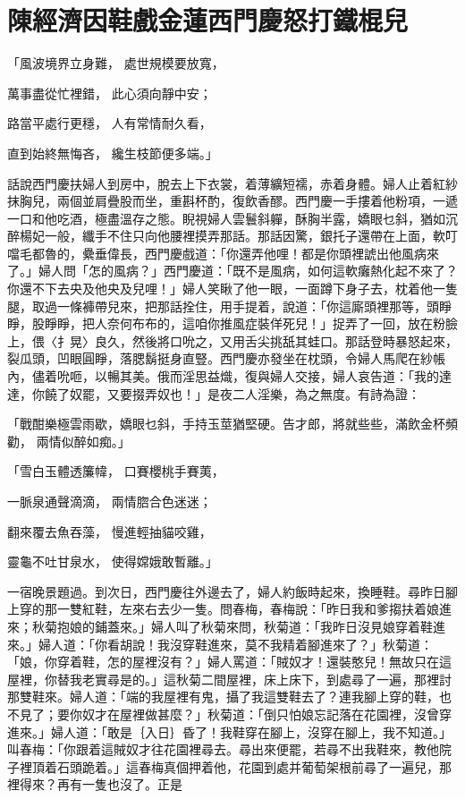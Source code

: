 %

\chapter{陳經濟因鞋戲金蓮\KG 西門慶怒打鐵棍兒}


\begin{showcontents}{}



「風波境界立身難，  處世規模要放寬，

萬事盡從忙裡錯，  此心須向靜中安；

路當平處行更穩，  人有常情耐久看，

直到始終無悔吝，  纔生枝節便多端。」

話說西門慶扶婦人到房中，脫去上下衣裳，着薄纊短襦，赤着身體。婦人止着紅紗抹胸兒，兩個並肩疊股而坐，重斟杯酌，復飲香醪。西門慶一手摟着他粉項，一遞一口和他吃酒，極盡溫存之態。睨視婦人雲鬟斜軃，酥胸半露，嬌眼乜斜，猶如沉醉楊妃一般，纖手不住只向他腰裡摸弄那話。那話因驚，銀托子還帶在上面，軟叮噹毛都魯的，纍垂偉長，西門慶戲道：「你還弄他哩！都是你頭裡諕出他風病來了。」婦人問「怎的風病？」西門慶道：「既不是風病，如何這軟癱熱化起不來了？你還不下去央及他央及兒哩！」婦人笑瞅了他一眼，一面蹲下身子去，枕着他一隻腿，取過一條褲帶兒來，把那話拴住，用手提着，說道：「你這廝頭裡那等，頭睜睜，股睜睜，把人奈何布布的，這咱你推風症裝佯死兒！」捉弄了一回，放在粉臉上，偎〈扌晃〉良久，然後將口吮之，又用舌尖挑舐其蛙口。那話登時暴怒起來，裂瓜頭，凹眼圓睜，落腮鬍挺身直豎。西門慶亦發坐在枕頭，令婦人馬爬在紗帳內，儘着吮咂，以暢其美。俄而淫思益熾，復與婦人交接，婦人哀告道：「我的達達，你饒了奴罷，又要掇弄奴也！」是夜二人淫樂，為之無度。有詩為證：

「戰酣樂極雲雨歇，嬌眼乜斜，手持玉莖猶堅硬。告才郎，將就些些，滿飲金杯頻勸，    兩情似醉如痴。」

「雪白玉體透簾幃，  口賽櫻桃手賽荑，

一脈泉通聲滴滴，  兩情脗合色迷迷；

翻來覆去魚吞藻，  慢進輕抽貓咬雞，

靈龜不吐甘泉水，  使得嫦娥敢暫離。」

一宿晚景題過。到次日，西門慶往外邊去了，婦人約飯時起來，換睡鞋。尋昨日腳上穿的那一雙紅鞋，左來右去少一隻。問春梅，春梅說：「昨日我和爹搊扶着娘進來；秋菊抱娘的鋪蓋來。」婦人叫了秋菊來問，秋菊道：「我昨日沒見娘穿着鞋進來。」婦人道：「你看胡說！我沒穿鞋進來，莫不我精着腳進來了？」秋菊道：「娘，你穿着鞋，怎的屋裡沒有？」婦人罵道：「賊奴才！還裝憨兒！無故只在這屋裡，你替我老實尋是的。」這秋菊二間屋裡，床上床下，到處尋了一遍，那裡討那雙鞋來。婦人道：「端的我屋裡有鬼，攝了我這雙鞋去了？連我腳上穿的鞋，也不見了；要你奴才在屋裡做甚麼？」秋菊道：「倒只怕娘忘記落在花園裡，沒曾穿進來。」婦人道：「敢是｛入日｝昏了！我鞋穿在腳上，沒穿在腳上，我不知道。」叫春梅：「你跟着這賊奴才往花園裡尋去。尋出來便罷，若尋不出我鞋來，教他院子裡頂着石頭跪着。」這春梅真個押着他，花園到處并葡萄架根前尋了一遍兒，那裡得來？再有一隻也沒了。正是


\end{showcontents}

